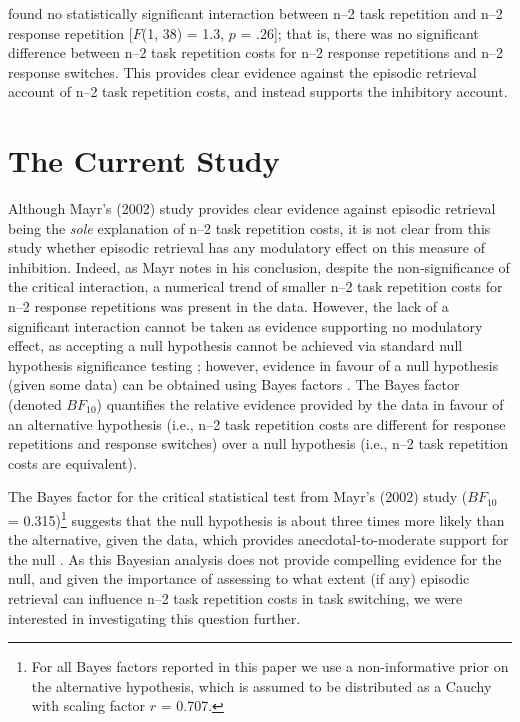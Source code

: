 \documentclass[a4paper, doc, natbib]{apa6}
\begin{document}
\cite{Mayr2002} found no statistically significant interaction between n--2 task repetition and n--2 response repetition [$F$(1, 38) = 1.3, $p$ = .26]; that is, there was no significant difference between n--2 task repetition costs for n--2 response repetitions and n--2 response switches. This provides clear evidence against the episodic retrieval account of n--2 task repetition costs, and instead supports the inhibitory account.

\section{The Current Study}
Although Mayr's (2002) study provides clear evidence against episodic retrieval being the \emph{sole} explanation of n--2 task repetition costs, it is not clear from this study whether episodic retrieval has any modulatory effect on this measure of inhibition. Indeed, as Mayr notes in his conclusion, despite the non-significance of the critical interaction, a numerical trend of smaller n--2 task repetition costs for n--2 response repetitions was present in the data. However, the lack of a significant interaction cannot be taken as evidence supporting no modulatory effect, as accepting a null hypothesis cannot be achieved via standard null hypothesis significance testing \citep{Gallistel2009, Wagenmakers2007}; however, evidence in favour of a null hypothesis (given some data) can be obtained using Bayes factors \citep[e.g.,][]{Rouder2009}. The Bayes factor (denoted $BF_{10}$) quantifies the relative evidence provided by the data in favour of an alternative hypothesis (i.e., n--2 task repetition costs are different for response repetitions and response switches) over a null hypothesis (i.e., n--2 task repetition costs are equivalent). 

The Bayes factor for the critical statistical test from Mayr's (2002) study ($BF_{10}$ = 0.315)\footnote{For all Bayes factors reported in this paper we use a non-informative prior on the alternative hypothesis, which is assumed to be distributed as a Cauchy with scaling factor $r$ = 0.707.} suggests that the null hypothesis is about three times more likely than the alternative, given the data, which provides anecdotal-to-moderate support for the null \citep[e.g.,][]{Schoenbrodtinpress}. As this Bayesian analysis does not provide compelling evidence for the null, and given the importance of assessing to what extent (if any) episodic retrieval can influence n--2 task repetition costs in task switching, we were interested in investigating this question further.
\end{document}
